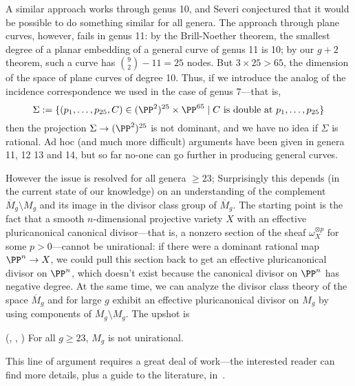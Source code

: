 A similar approach works through genus 10, and Severi conjectured that it would be possible to do something similar for all genera. The approach through plane curves, however, fails in genus 11: by the Brill-Noether theorem, the smallest degree of a planar embedding of a general curve of genus 11 is 10; by our $g+2$ theorem, such a curve has ${9\choose 2}-11 = 25$ nodes. But $3 \times 25 > 65$, the dimension of the space of plane curves of degree 10. Thus, if we introduce the analog of the incidence correspondence we used in the case of genus 7---that is,
$$
\Sigma := \{ (p_1,\dots,p_{25},C) \in (\PP^2)^{25} \times \PP^{65} \mid C \text{ is double at } p_1,\dots,p_{25} \}
$$
then the projection $\Sigma \to (\PP^2)^{25}$ is not dominant, and we have no idea if $\Sigma$ is rational.
 Ad hoc (and much more difficult) arguments have been given in genera 11, 12 13 and 14, but so far no-one can go further in producing general curves. 
 
However the issue is resolved for all genera $\geq 23$; Surprisingly this depends (in the current state of our knowledge) on an understanding of the complement
$\overline M_{g}\setminus M_{g}$ and its image in the divisor class group of $\overline M_{g}$. The starting point is the fact that a smooth $n$-dimensional projective variety $X$ with an effective pluricanonical canonical divisor---that is, a nonzero section of the sheaf $\omega_{X}^{\otimes p}$ for some $p>0$---cannot be unirational: if there were a dominant rational map $\PP^n \to X$, we could pull this section back to get an effective pluricanonical divisor on $\PP^n$, which doesn't exist because
the canonical divisor on $\PP^{n}$ has negative degree. At the same time, we can analyze the divisor class theory of the space $\overline M_g$ and for large $g$ exhibit an effective pluricanonical divisor on $M_g$ by using components of  $\overline M_{g}\setminus M_{g}$. 
The upshot is 
\begin{theorem}(\cite{Harris-MumfordModuli}, \cite{HarrisModuli}, \cite{Eisenbud-HarrisModuli})
For all $g \geq 23$, $M_g$ is not unirational.
\end{theorem}
This line of argument requires a great deal of work---the interested reader can find more details, plus a guide to the literature, in~\cite{MR1631825}.

